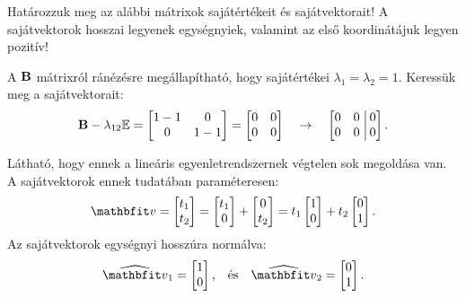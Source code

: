 \begin{exercise}{%
    Határozzuk meg az alábbi mátrixok sajátértékeit és sajátvektorait!
    A sajátvektorok hosszai legyenek egységnyiek, valamint az első koordinátájuk
    legyen pozitív!
  }
{  A $\mathbf{B}$ mátrixról ránézésre megállapítható, hogy sajátértékei $\lambda_1
    = \lambda_2 = 1$. Keressük meg a sajátvektorait:
  \[
    \mathbf{B} - \lambda_{12} {\mathbb{E}} = \begin{bmatrix}
      1 - 1 & 0     \\
      0     & 1 - 1
    \end{bmatrix} = \begin{bmatrix}
      0 & 0 \\
      0 & 0
    \end{bmatrix}
    \quad \rightarrow \quad
    \left[\begin{matrix}
        0 & 0 \\
        0 & 0
      \end{matrix}\right.\left|\begin{matrix}
        \,0 \\ \,0
      \end{matrix}\right]
    \text.
  \]

  Látható, hogy ennek a lineáris egyenletrendszernek végtelen sok megoldása van.
  A sajátvektorok ennek tudatában paraméteresen:
  \[
    \rvec v = \begin{bmatrix}
      t_1 \\ t_2
    \end{bmatrix} = \begin{bmatrix}
      t_1 \\ 0
    \end{bmatrix} + \begin{bmatrix}
      0 \\ t_2
    \end{bmatrix} = t_1 \begin{bmatrix}
      1 \\ 0
    \end{bmatrix} + t_2 \begin{bmatrix}
      0 \\ 1
    \end{bmatrix}
    \text{.}
  \]
  Az sajátvektorok egységnyi hosszúra normálva:
  \[
    \uvec v_1 = \begin{bmatrix}
      1 \\ 0
    \end{bmatrix}
    \text{,}
    \quad \text{és} \quad
    \uvec v_2 = \begin{bmatrix}
      0 \\ 1
    \end{bmatrix}
    \text{.}
  \]

  \tcbline

}
\end{exercise}

